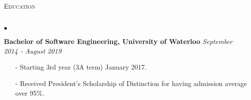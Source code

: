 \documentclass[11pt]{article}
\newcommand{\lineunder}{\vspace*{-8pt} \\ \hspace*{-18pt} \hrulefill \\}
\newcommand{\header}[1]{{\hspace*{-15pt}\vspace*{6pt} \textsc{#1}} \vspace*{-6pt} \lineunder }
\newenvironment{achievements}{\begin{list}{$\bullet$}{\topsep 0pt \itemsep -1.5pt \leftmargin 5pt}}{\vspace*{4pt}\end{list}}
\begin{document}
\vspace{5pt}

\header{\fontsize{11.1}{10}\selectfont  Education}
\begin{achievements}
\item \textbf{Bachelor of Software Engineering, University of Waterloo} \hfill \textit {September 2014 - August 2019}
\begin{itemize}
\vspace{2pt}
\item[-] Starting 3rd year (3A term) January 2017.
\vspace{2pt}
\item[-] Received President's Scholarship of Distinction for having admission average over 95\%.
\vspace{2pt}
\end{itemize}
\end{achievements}
\end{document}
